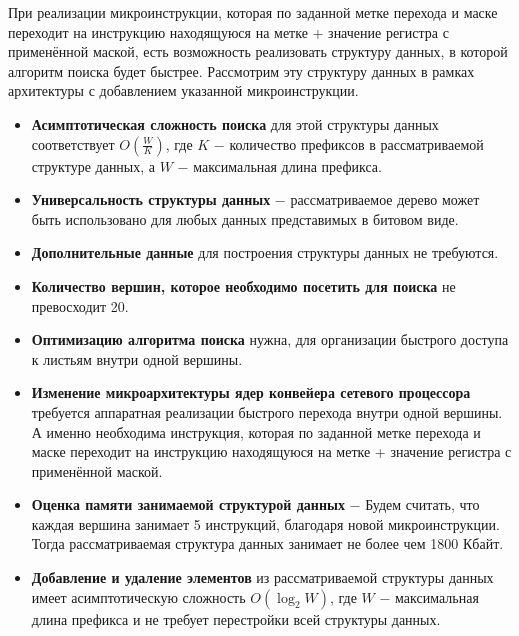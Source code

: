 \documentclass[a4peper, 12pt, titlepage, finall]{report}
\begin{document}
            При реализации микроинструкции, которая по заданной метке перехода и маске переходит на инструкцию находящуюся на метке + значение регистра с применённой маской,
            есть возможность реализовать структуру данных, в которой алгоритм поиска будет быстрее. Рассмотрим эту структуру данных в рамках архитектуры с добавлением указанной микроинструкции.\\
            \begin{itemize}
                \item\textbf{Асимптотическая сложность поиска} для этой структуры данных соответствует {\ttfamily $O(\frac{W}{K})$},
                где {\ttfamily $K$} $-$ количество префиксов в рассматриваемой структуре данных, а {\ttfamily $W$} $-$ максимальная длина префикса.
                \item\textbf{Универсальность структуры данных} $-$ рассматриваемое дерево может быть использовано для любых данных представимых в битовом виде.
                \item\textbf{Дополнительные данные} для построения структуры данных не требуются.
                \item\textbf{Количество вершин, которое необходимо посетить для поиска} не превосходит 20.
                \item\textbf{Оптимизацию алгоритма поиска} нужна, для организации быстрого доступа к листьям внутри одной вершины.
                \item\textbf{Изменение микроархитектуры ядер конвейера сетевого процессора} требуется аппаратная реализации быстрого перехода внутри одной вершины.
                А именно необходима инструкция, которая по заданной метке перехода и маске переходит на инструкцию находящуюся на метке + значение регистра с применённой маской.
                \item\textbf{Оценка памяти занимаемой структурой данных} $-$ Будем считать, что каждая вершина занимает 5 инструкций, благодаря новой микроинструкции.
                Тогда рассматриваемая структура данных занимает не более чем 1800 Кбайт.
                \item\textbf{Добавление и удаление элементов} из рассматриваемой структуры данных имеет асимптотическую сложность 
                {\ttfamily $O(\log_2{W})$}, где {\ttfamily $W$} $-$ максимальная длина префикса и не требует перестройки всей структуры данных.\\
            \end{itemize}
\end{document}
